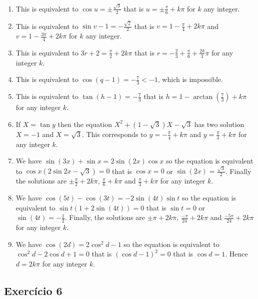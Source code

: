 \begin{enumerate}
\item This is equivalent to $\cos{u} = \pm \frac{\sqrt{3}}{2}$
  that is $u = \pm \frac{\pi}{6} + k\pi$ for $k$ any integer.
\item This is equivalent to
  $\sin{v-1} = -\frac{\sqrt{2}}{2}$ that is
  $v = 1 - \frac{\pi}{4} + 2k\pi$ and
  $v = 1 - \frac{3\pi}{4} + 2k\pi$ for $k$ any integer.
\item This is equivalent to
  $3r+2 = \frac{\pi}{2} + 2k\pi$ that is
  $r = -\frac{2}{3} + \frac{\pi}{6} + \frac{2k}{3} \pi$
  for any integer $k$.
\item This is equivalent to
  $\cos{(q-1)} = -\frac{7}{3} < -1$, which is impossible.
\item This is equivalent to
  $\tan{(h-1)} = -\frac{7}{3}$ that is
  $h = 1 - \arctan\left(\frac{7}{3}\right) + k\pi$ for any integer $k$.
\item If $X=\tan{y}$ then the equation $X^2 + {(1-\sqrt{3})} X - \sqrt{3}$
  has two solution $X=-1$ and $X=\sqrt{3}$. This corresponds to
  $y = -\frac{\pi}{4} + k \pi$ and $y = \frac{\pi}{3} + k\pi$ for any
  integer $k$.
\item We have $\sin {(3x)} +  \sin x = 2 \sin{(2x)} \cos{x}$ so the equation is
  equivalent to $\cos{x} \left(2 \sin{2x} - \sqrt{3}\right) = 0$ that is
  $\cos{x} = 0$ or $\sin{(2x)} = \frac{\sqrt{3}}{2}$. Finally the solutions are
  $\pm \frac{\pi}{2} + 2k\pi$, $\frac{\pi}{6} + k\pi$ and
  $\frac{\pi}{3} + k\pi$ for any integer $k$.
\item We have $\cos{(5t)} - \cos{(3t)} = -2 \sin{(4t)}\sin{t}$
  so the equation is equivalent to
  $\sin{t} \left(1+2\sin{(4t)}\right) = 0$
  that is $\sin{t} = 0$ or $\sin{(4t)} = -\frac{1}{2}$.
  Finally, the solutions are
  $\pm \pi + 2k\pi$,
  $\frac{-\pi}{24} + 2k\pi$ and $\frac{-5\pi}{24} + 2k\pi$ for any
  integer $k$.
\item
  We have $\cos{(2d)} = 2\cos^2{d} -1$
  so the equation is equivalent to
  $\cos^2{d} - 2\cos{d} + 1 = 0$
  that is ${(\cos{d} - 1)}^2 = 0$
  that is $\cos{d} = 1$. Hence $d = 2k\pi$ for any integer $k$.
\end{enumerate}

\subsection*{Exercício 6}

